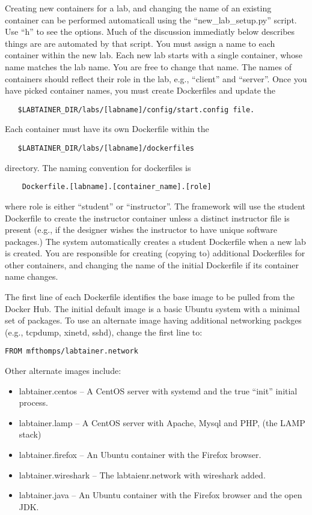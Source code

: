 \documentclass[12pt]{article}
\begin{document}
Creating new containers for a lab, and changing the name of an existing container
can be performed automaticall using the ``new\_lab\_setup.py'' script.  Use ``h'' to see
the options.  Much of the discussion immediatly below describes things are are
automated by that script.
You must assign a name to each container within the new lab.  Each new lab
starts with a single container, whose name matches the lab name.  You are free
to change that name. The names of containers should reflect their role in the lab,
e.g., ``client'' and ``server''.  Once you have picked container names, you must create
Dockerfiles and update the 
\begin{verbatim}
   $LABTAINER_DIR/labs/[labname]/config/start.config file.

\end{verbatim}
\noindent Each container must have its own Dockerfile within the 
\begin{verbatim}
   $LABTAINER_DIR/labs/[labname]/dockerfiles
\end{verbatim}
\noindent directory.  The naming convention for dockerfiles is
\begin{verbatim}
    Dockerfile.[labname].[container_name].[role]
\end{verbatim}
where role is either ``student'' or ``instructor''.  The framework will use the student Dockerfile to
create the instructor container unless a distinct instructor file is present (e.g., if the designer
wishes the instructor to have unique software packages.) The system automatically creates a student Dockerfile
when a new lab is created.  You are responsible for creating (copying to) additional Dockerfiles for other containers,
and changing the name of the initial Dockerfile if its container name changes.

The first line of each Dockerfile identifies the base image to be pulled from the Docker Hub.
The initial default image is a basic Ubuntu system with a minimal set of packages.  To use an
alternate image having additional networking packges (e.g., tcpdump, xinetd, sshd), change the first line to:
\begin{verbatim}
FROM mfthomps/labtainer.network
\end{verbatim}
\noindent Other alternate images include:
\begin{itemize}
\item labtainer.centos -- A CentOS server with systemd and the true ``init'' initial process.
\item labtainer.lamp -- A CentOS server with Apache, Mysql and PHP, (the LAMP stack)
\item labtainer.firefox -- An Ubuntu container with the Firefox browser.
\item labtainer.wireshark -- The labtaienr.network with wireshark added.
\item labtainer.java -- An Ubuntu container with the Firefox browser and the open JDK.
\end{itemize}
\end{document}
